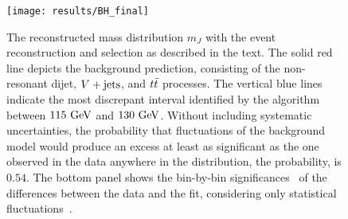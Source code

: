 \begin{figure}[htbp]
 \centering
 \texttt{[image: results/BH\_final]}
 \caption[\BumpHunter{} fit of post-fit background-only model to data.]{%
  The reconstructed mass distribution $m_{J}$ with the event reconstruction and selection as described in the text.
  The solid red line depicts the background prediction, consisting of the non-resonant dijet, $V + \text{jets}$, and $t\bar{t}$ processes.
  The vertical blue lines indicate the most discrepant interval identified by the \BumpHunter{} algorithm between $115~\mathrm{GeV}$ and $130~\mathrm{GeV}$.
  Without including systematic uncertainties, the probability that fluctuations of the background model would produce an excess at least as significant as the one observed in the data anywhere in the distribution, the \BumpHunter{} probability, is $0.54$.
  The bottom panel shows the bin-by-bin significances~\cite{Choudalakis:2012} of the differences between the data and the fit, considering only statistical fluctuations~\cite{ATLAS-CONF-2018-052}.
 }
 \label{fig:BumpHunter_scan}
\end{figure}
